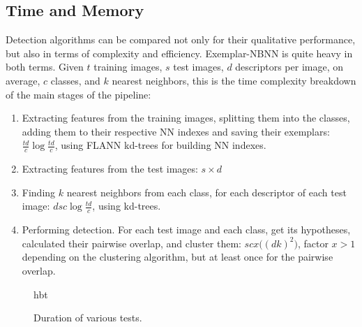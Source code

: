 
\subsection{Time and Memory} %
\label{sub:time_and_memory_constraints}

Detection algorithms can be compared not only for their qualitative performance, but also in terms of complexity and efficiency. Exemplar-NBNN is quite heavy in both terms. Given $t$ training images, $s$ test images, $d$ descriptors per image, on average, $c$ classes, and $k$ nearest neighbors, this is the time complexity breakdown of the main stages of the pipeline:
\begin{enumerate}
    \item Extracting features from the training images, splitting them into the classes, adding them to their respective NN indexes and saving their exemplars: $\frac{td}{c} \log \frac{td}{c}$, using FLANN kd-trees for building NN indexes.
    \item Extracting features from the test images: $s\times d$
    \item Finding $k$ nearest neighbors from each class, for each descriptor of each test image: $d s c \log \frac{td}{c} $, using kd-trees.
    \item Performing detection. For each test image and each class, get its hypotheses, calculated their pairwise overlap, and cluster them: $s c x\big((d k)^2\big)$, factor $x>1$ depending on the clustering algorithm, but at least once for the pairwise overlap.
\end{enumerate}

\begin{figure}{hbt}
    \centering
    \caption{Duration of various tests.}
    \label{fig:duration}
\end{figure}





